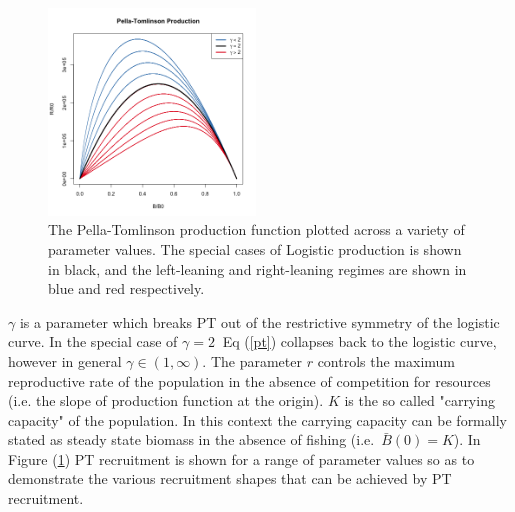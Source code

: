 \documentclass[12pt]{article}
\begin{document}
%
\begin{figure} %
\vspace{-1cm}
\includegraphics[width=0.49\textwidth]{../ptNew/g4PT.png}
\vspace{-1cm}
\caption{
The Pella-Tomlinson production function plotted across a variety of parameter
values. The special cases of Logistic production is shown in black, and the 
left-leaning and right-leaning regimes are shown in blue and red respectively.
}
\label{SrrPT}
\end{figure}

%
$\gamma$ is a parameter which breaks PT out of the restrictive symmetry of the 
logistic curve. In the special case of $\gamma=2~$ Eq (\ref{pt}) 
collapses back to the logistic curve, however in general $\gamma\in(1, \infty)$.
%
The parameter $r$ controls the maximum reproductive rate of the population
in the absence of competition for resources (i.e. the slope of production
function at the origin). $K$ is the so called "carrying capacity" of the
population. In this context the carrying capacity can be formally stated as
steady state biomass in the absence of fishing \mbox{(i.e. $\bar B(0)=K$).}
%
In Figure (\ref{SrrPT}) PT recruitment is shown for a range of parameter values 
so as to demonstrate the various recruitment shapes that can be achieved by PT 
recruitment.  
\end{document}
